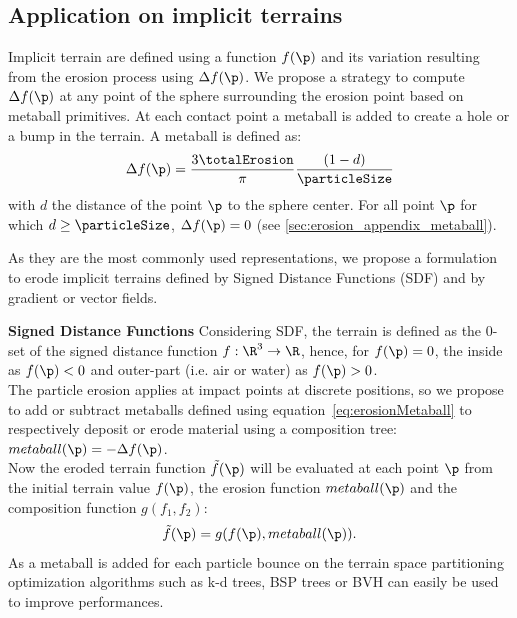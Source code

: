 \subsection{Application on implicit terrains}
\label{sec:erosion_application_on_implicit}
Implicit terrain are defined using a function $f(\p)$ and its variation resulting from the erosion process using $\Delta f(\p)$.
We propose a strategy to compute $\Delta f(\p)$ at any point of the sphere surrounding the erosion point based on metaball primitives. At each contact point a metaball is added to create a hole or a bump in the terrain. A metaball is defined as: 
\begin{align}\label{eq:erosionMetaball}
\Delta f(\p) = \frac{3 \totalErosion}{\pi} \frac{(1 - d)}{\particleSize}
\end{align}
with $d$ the distance of the point $\p$ to the sphere center. For all point $\p$ for which $d \geq \particleSize$, $\Delta f(\p) = 0$ (see \ref{sec:erosion_appendix_metaball}).

As they are the most commonly used representations, we propose a formulation to erode implicit terrains defined by Signed Distance Functions (SDF) and by gradient or vector fields.

\textbf{Signed Distance Functions}
\label{sec:erosion_application_on_sdf}
Considering SDF, the terrain is defined as the 0-set of the signed distance function $f: \R^3 \to \R$, hence, for $f(\p) = 0$, the inside as $f(\p) < 0$ and outer-part (i.e. air or water) as $f(\p) > 0$. \\ 
The particle erosion applies at impact points at discrete positions, so we propose to add or subtract metaballs defined using equation~\eqref{eq:erosionMetaball} to respectively deposit or erode material using a composition tree:\\ $metaball(\p) = -\Delta f(\p)$.\\
Now the eroded terrain function $\Tilde{f}(\p)$ will be evaluated at each point $\p$ from the initial terrain value $f(\p)$, the erosion function $metaball(\p)$ and the composition function $g(f_1, f_2)$:
\begin{align} \label{eq:finalMetaball}
\Tilde{f}(\p) = g(f(\p), metaball(\p)).  \nonumber
\end{align}
As a metaball is added for each particle bounce on the terrain space partitioning optimization algorithms such as k-d trees, BSP trees or BVH can easily be used to improve performances.

